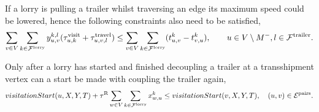 If a lorry is pulling a trailer whilst traversing an edge its maximum speed could be lowered, hence the following constraints also need to be satisfied,
\begin{align}
  \sum_{v \in V} \sum_{k \in \mathcal F^{\rm lorry}} y^{k,l}_{u,v} (\tau_{u,k}^{\rm visit} + \tau_{u,v,l}^{\rm travel}) \leq \sum_{v \in V} \sum_{k \in \mathcal F^{\rm lorry}} (t_{u,v}^k - t_{v,u}^k),
  \qquad u\in V \setminus M^-, l \in \mathcal{F}^{\rm trailer}.
\end{align}


Only after a lorry has started and finished decoupling a trailer at a transshipment vertex can a start be made with coupling the trailer again,  
%
\begin{align}
  visitationStart(u, X,Y, T) +
  \tau^{\rm R}   \sum_{w \in V} \sum_{k \in \mathcal F^{\rm lorry}} x^k_{w,u}   
  \leq
  visitationStart(v, X,Y, T) ,
  \quad (u,v) \in \mathcal E^{\rm pairs}.
\end{align}





